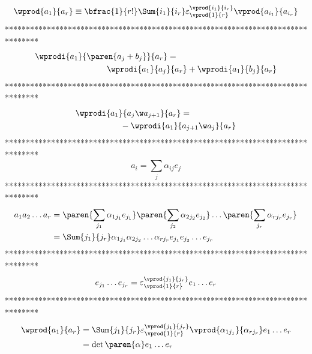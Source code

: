 \begin{equation}\label{EQ1_13}
\wprod{a_{1}}{a_{r}} \equiv \bfrac{1}{r!}\Sum{i_{1}}{i_{r}}
     \varepsilon^{\vprod{i_{1}}{i_{r}}}_{\vprod{1}{r}}
     \vprod{a_{i_{1}}}{a_{i_{r}}}
\end{equation}
********************************************************************************
\begin{align}
\wprodi{a_{1}}{\paren{a_{j}+b_{j}}}{a_{r}} &=   \nonumber  \\
    & \hspace{-1in}\wprodi{a_{1}}{a_{j}}{a_{r}}+
     \wprodi{a_{1}}{b_{j}}{a_{r}}\label{EQ1_14}
\end{align}
********************************************************************************
\begin{align}
\wprodi{a_{1}}{a_{j}\w a_{j+1}}{a_{r}} & =  \nonumber  \\
  & \hspace{-1in}   -\wprodi{a_{1}}{a_{j+1}\w a_{j}}{a_{r}}\label{EQ1_15}
\end{align}
********************************************************************************
\begin{equation}\label{EQ1_16}
	a_{i} = \sum_{j}\alpha_{ij}e_{j}
\end{equation}
********************************************************************************
\begin{align}
	a_{1}a_{2}\dots a_{r} & =  \paren{\sum_{j_{1}}\alpha_{1j_{1}}
				   e_{j_{1}}} 
	\paren{\sum_{j_{2}}\alpha_{2j_{2}}e_{j_{2}}}
	\dots\paren{\sum_{j_{r}}\alpha_{rj_{r}}
	e_{j_{r}}} \nonumber  \\
	& = \Sum{j_{1}}{j_{r}}\alpha_{1j_{1}}\alpha_{2j_{2}}\dots\alpha_{rj_{r}}
	      e_{j_{1}}e_{j_{2}}\dots e_{j_{r}} \label{EQ1_17}
\end{align}
********************************************************************************
\begin{equation}\label{EQ1_18}
	e_{j_{1}}\dots e_{j_{r}} = \varepsilon^{\vprod{j_{1}}{j_{r}}}_{\vprod{1}{r}}
        e_{1}\dots e_{r}		
\end{equation}
********************************************************************************
\begin{align}
\wprod{a_{1}}{a_{r}} & = \Sum{j_{1}}{j_{r}}\varepsilon^{\vprod{j_{1}}{j_{r}}}_{\vprod{1}{r}} 
                           \vprod{\alpha_{1j_{1}}}{\alpha_{rj_{r}}}e_{1}\dots e_{r} \label{EQ1_19} \\
		     & = \det\paren{\alpha}e_{1}\dots e_{r}\label{EQ1_20}
\end{align}
